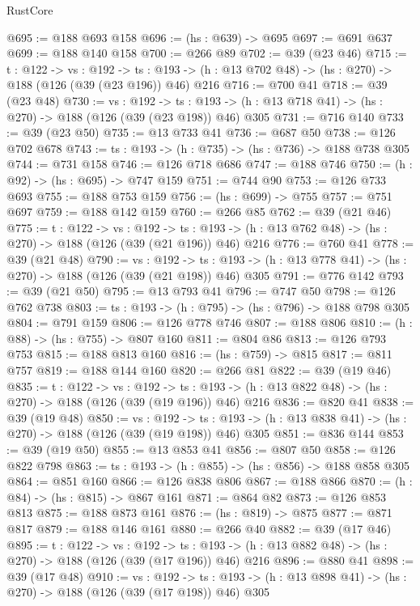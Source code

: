 \begin{lexlean}{RustCore}
\begin{coremodule}
@695 := @188 @693 @158
@696 := (hs : @639) -> @695
@697 := @691 @637
@699 := @188 @140 @158
@700 := @266 @89
@702 := @39 (@23 @46)
@715 := {t : @122} ->
  {vs : @192} ->
  {ts : @193} -> (h : @13 @702 @48) -> (hs : @270) -> @188 (@126 (@39 (@23 @196)) @46) @216
@716 := @700 @41
@718 := @39 (@23 @48)
@730 := {vs : @192} ->
  {ts : @193} -> (h : @13 @718 @41) -> (hs : @270) -> @188 (@126 (@39 (@23 @198)) @46) @305
@731 := @716 @140
@733 := @39 (@23 @50)
@735 := @13 @733 @41
@736 := @687 @50
@738 := @126 @702 @678
@743 := {ts : @193} -> (h : @735) -> (hs : @736) -> @188 @738 @305
@744 := @731 @158
@746 := @126 @718 @686
@747 := @188 @746
@750 := (h : @92) -> (hs : @695) -> @747 @159
@751 := @744 @90
@753 := @126 @733 @693
@755 := @188 @753 @159
@756 := (hs : @699) -> @755
@757 := @751 @697
@759 := @188 @142 @159
@760 := @266 @85
@762 := @39 (@21 @46)
@775 := {t : @122} ->
  {vs : @192} ->
  {ts : @193} -> (h : @13 @762 @48) -> (hs : @270) -> @188 (@126 (@39 (@21 @196)) @46) @216
@776 := @760 @41
@778 := @39 (@21 @48)
@790 := {vs : @192} ->
  {ts : @193} -> (h : @13 @778 @41) -> (hs : @270) -> @188 (@126 (@39 (@21 @198)) @46) @305
@791 := @776 @142
@793 := @39 (@21 @50)
@795 := @13 @793 @41
@796 := @747 @50
@798 := @126 @762 @738
@803 := {ts : @193} -> (h : @795) -> (hs : @796) -> @188 @798 @305
@804 := @791 @159
@806 := @126 @778 @746
@807 := @188 @806
@810 := (h : @88) -> (hs : @755) -> @807 @160
@811 := @804 @86
@813 := @126 @793 @753
@815 := @188 @813 @160
@816 := (hs : @759) -> @815
@817 := @811 @757
@819 := @188 @144 @160
@820 := @266 @81
@822 := @39 (@19 @46)
@835 := {t : @122} ->
  {vs : @192} ->
  {ts : @193} -> (h : @13 @822 @48) -> (hs : @270) -> @188 (@126 (@39 (@19 @196)) @46) @216
@836 := @820 @41
@838 := @39 (@19 @48)
@850 := {vs : @192} ->
  {ts : @193} -> (h : @13 @838 @41) -> (hs : @270) -> @188 (@126 (@39 (@19 @198)) @46) @305
@851 := @836 @144
@853 := @39 (@19 @50)
@855 := @13 @853 @41
@856 := @807 @50
@858 := @126 @822 @798
@863 := {ts : @193} -> (h : @855) -> (hs : @856) -> @188 @858 @305
@864 := @851 @160
@866 := @126 @838 @806
@867 := @188 @866
@870 := (h : @84) -> (hs : @815) -> @867 @161
@871 := @864 @82
@873 := @126 @853 @813
@875 := @188 @873 @161
@876 := (hs : @819) -> @875
@877 := @871 @817
@879 := @188 @146 @161
@880 := @266 @40
@882 := @39 (@17 @46)
@895 := {t : @122} ->
  {vs : @192} ->
  {ts : @193} -> (h : @13 @882 @48) -> (hs : @270) -> @188 (@126 (@39 (@17 @196)) @46) @216
@896 := @880 @41
@898 := @39 (@17 @48)
@910 := {vs : @192} ->
  {ts : @193} -> (h : @13 @898 @41) -> (hs : @270) -> @188 (@126 (@39 (@17 @198)) @46) @305

\end{coremodule}
\end{lexlean}
